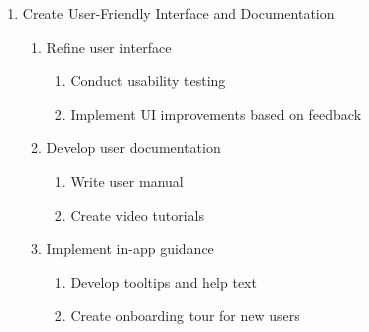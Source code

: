 \documentclass[12pt]{article}
\begin{document}
\begin{enumerate}
    \item Create User-Friendly Interface and Documentation
    \begin{enumerate}
        \item Refine user interface
        \begin{enumerate}
            \item Conduct usability testing
            \item Implement UI improvements based on feedback
        \end{enumerate}
        \item Develop user documentation
        \begin{enumerate}
            \item Write user manual
            \item Create video tutorials
        \end{enumerate}
        \item Implement in-app guidance
        \begin{enumerate}
            \item Develop tooltips and help text
            \item Create onboarding tour for new users
        \end{enumerate}
    \end{enumerate}
\end{enumerate}
\end{document}

